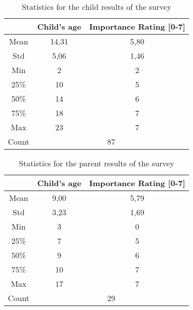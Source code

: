\begin{table}[H]
\centering
\caption{Statistics for the child results of the survey}
\label{tab:stats_children}
\begin{tabular}{c|c|c|}
\cline{2-3}
                            & \textbf{Child's age} & \textbf{Importance Rating {[}0-7{]}} \\ \hline
\multicolumn{1}{|c|}{Mean}  & 14,31                & 5,80                                 \\ 
\multicolumn{1}{|c|}{Std}   & 5,06                 & 1,46                                 \\ 
\multicolumn{1}{|c|}{Min}   & 2                    & 2                                    \\ 
\multicolumn{1}{|c|}{25\%}  & 10                   & 5                                    \\ 
\multicolumn{1}{|c|}{50\%}  & 14                   & 6                                    \\ 
\multicolumn{1}{|c|}{75\%}  & 18                   & 7                                    \\ 
\multicolumn{1}{|c|}{Max}   & 23                   & 7                                    \\ \hline
\multicolumn{1}{|c|}{Count} & \multicolumn{2}{c|}{87}                                     \\ \hline
\end{tabular}
\end{table}

\begin{table}[H]
\centering
\caption{Statistics for the parent results of the survey}
\label{tab:stats_parents}
\begin{tabular}{c|c|c|}
\cline{2-3}
                            & \textbf{Child's age} & \textbf{Importance Rating {[}0-7{]}} \\ \hline
\multicolumn{1}{|c|}{Mean}  & 9,00                 & 5,79                                 \\ 
\multicolumn{1}{|c|}{Std}   & 3,23                 & 1,69                                 \\ 
\multicolumn{1}{|c|}{Min}   & 3                    & 0                                    \\ 
\multicolumn{1}{|c|}{25\%}  & 7                    & 5                                    \\ 
\multicolumn{1}{|c|}{50\%}  & 9                    & 6                                    \\ 
\multicolumn{1}{|c|}{75\%}  & 10                   & 7                                    \\ 
\multicolumn{1}{|c|}{Max}   & 17                   & 7                                    \\ \hline
\multicolumn{1}{|c|}{Count} & \multicolumn{2}{c|}{29}                                     \\ \hline
\end{tabular}
\end{table}

